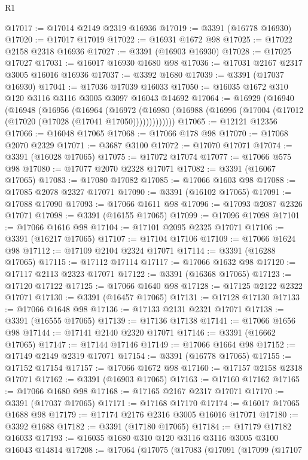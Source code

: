 \begin{lexlean}{R1}
\begin{coremodule}
@17017 := @17014 @2149 @2319 @16936
@17019 := @3391 (@16778 @16930)
@17020 := @17017 @17019
@17022 := @16931 @1672 @98
@17025 := @17022 @2158 @2318 @16936
@17027 := @3391 (@16903 @16930)
@17028 := @17025 @17027
@17031 := @16017 @16930 @1680 @98
@17036 := @17031 @2167 @2317 @3005 @16016 @16936
@17037 := @3392 @1680
@17039 := @3391 (@17037 @16930)
@17041 := @17036 @17039 @16033
@17050 := @16035 @1672 @310 @120 @3116 @3116 @3005 @3097 @16043 @14692
@17064 := @16929
    (@16940
      (@16948
        (@16956
          (@16964
            (@16972
              (@16980 (@16988 (@16996 (@17004 (@17012 (@17020 (@17028 (@17041 @17050)))))))))))))
@17065 := @12121 @12356
@17066 := @16048 @17065
@17068 := @17066 @178 @98
@17070 := @17068 @2070 @2329
@17071 := @3687 @3100
@17072 := @17070 @17071
@17074 := @3391 (@16028 @17065)
@17075 := @17072 @17074
@17077 := @17066 @575 @98
@17080 := @17077 @2070 @2328 @17071
@17082 := @3391 (@16067 @17065)
@17083 := @17080 @17082
@17085 := @17066 @1603 @98
@17088 := @17085 @2078 @2327 @17071
@17090 := @3391 (@16102 @17065)
@17091 := @17088 @17090
@17093 := @17066 @1611 @98
@17096 := @17093 @2087 @2326 @17071
@17098 := @3391 (@16155 @17065)
@17099 := @17096 @17098
@17101 := @17066 @1616 @98
@17104 := @17101 @2095 @2325 @17071
@17106 := @3391 (@16217 @17065)
@17107 := @17104 @17106
@17109 := @17066 @1624 @98
@17112 := @17109 @2104 @2324 @17071
@17114 := @3391 (@16288 @17065)
@17115 := @17112 @17114
@17117 := @17066 @1632 @98
@17120 := @17117 @2113 @2323 @17071
@17122 := @3391 (@16368 @17065)
@17123 := @17120 @17122
@17125 := @17066 @1640 @98
@17128 := @17125 @2122 @2322 @17071
@17130 := @3391 (@16457 @17065)
@17131 := @17128 @17130
@17133 := @17066 @1648 @98
@17136 := @17133 @2131 @2321 @17071
@17138 := @3391 (@16555 @17065)
@17139 := @17136 @17138
@17141 := @17066 @1656 @98
@17144 := @17141 @2140 @2320 @17071
@17146 := @3391 (@16662 @17065)
@17147 := @17144 @17146
@17149 := @17066 @1664 @98
@17152 := @17149 @2149 @2319 @17071
@17154 := @3391 (@16778 @17065)
@17155 := @17152 @17154
@17157 := @17066 @1672 @98
@17160 := @17157 @2158 @2318 @17071
@17162 := @3391 (@16903 @17065)
@17163 := @17160 @17162
@17165 := @17066 @1680 @98
@17168 := @17165 @2167 @2317 @17071
@17170 := @3391 (@17037 @17065)
@17171 := @17168 @17170
@17174 := @16017 @17065 @1688 @98
@17179 := @17174 @2176 @2316 @3005 @16016 @17071
@17180 := @3392 @1688
@17182 := @3391 (@17180 @17065)
@17184 := @17179 @17182 @16033
@17193 := @16035 @1680 @310 @120 @3116 @3116 @3005 @3100 @16043 @14814
@17208 := @17064
    (@17075
      (@17083
        (@17091
          (@17099
            (@17107

\end{coremodule}
\end{lexlean}
